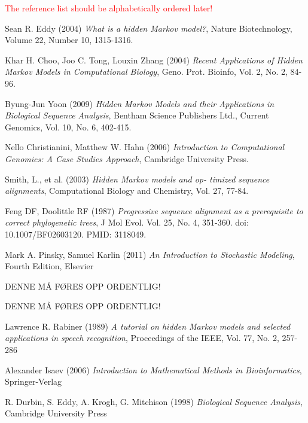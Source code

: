 \documentclass{article}
\begin{document}
\textcolor{red}{The reference list should be alphabetically ordered later!}
\begin{thebibliography}{20}
Sean R. Eddy (2004) \emph{What is a hidden Markov model?}, Nature Biotechnology, Volume 22, Number 10, 1315-1316.

Khar H. Choo, Joo C. Tong, Louxin Zhang (2004) \emph{Recent Applications of Hidden Markov Models in Computational Biology}, Geno. Prot. Bioinfo, Vol. 2, No. 2, 84-96.

Byung-Jun Yoon (2009) \emph{Hidden Markov Models and their Applications in Biological Sequence Analysis}, Bentham Science Publishers Ltd., Current Genomics, Vol. 10, No. 6, 402-415.

Nello Christianini, Matthew W. Hahn (2006) \emph{Introduction to Computational Genomics: A Case Studies Approach}, Cambridge University Press.

Smith, L., et al. (2003) \emph{Hidden Markov models and op-
timized sequence alignments}, Computational Biology and Chemistry, Vol. 27, 77-84.

Feng DF, Doolittle RF (1987) \emph{Progressive sequence alignment as a prerequisite to correct phylogenetic trees}, J Mol Evol. Vol. 25, No. 4, 351-360. doi: 10.1007/BF02603120. PMID: 3118049.

Mark A. Pinsky, Samuel Karlin (2011) \emph{An Introduction to Stochastic Modeling}, Fourth Edition, Elsevier

DENNE MÅ FØRES OPP ORDENTLIG!

DENNE MÅ FØRES OPP ORDENTLIG!

Lawrence R. Rabiner (1989) \emph{A tutorial on hidden Markov models and selected applications in speech recognition}, Proceedings of the IEEE, Vol. 77, No. 2, 257-286

Alexander Isaev (2006) \emph{Introduction to Mathematical Methods in Bioinformatics}, Springer-Verlag

R. Durbin, S. Eddy, A. Krogh, G. Mitchison (1998) \emph{Biological Sequence Analysis}, Cambridge University Press

\end{thebibliography}
\end{document}

